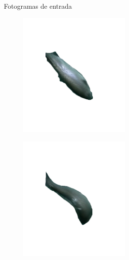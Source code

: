 \begin{enumerate}
\begin{figure}[H]
\begin{subfigure}[b]{\textwidth}
\begin{subfigure}[b]{0.25\textwidth}
                \end{subfigure}
                \caption{Fotogramas de entrada}
                \label{fig:FotogramasEntrada}
            \end{subfigure}
            \begin{subfigure}[b]{\textwidth}
                \centering
                \begin{subfigure}[b]{0.25\textwidth}
                    \centering
                    \includegraphics[width=0.8\textwidth]{images/6/Vacio2.png}
                    \label{fig:Vacio2}
                \end{subfigure}
                \begin{subfigure}[b]{0.25\textwidth}
                    \centering
                    \includegraphics[width=0.8\textwidth]{images/6/Vacio3.png}

\end{subfigure}
\end{subfigure}
\end{figure}
\end{enumerate}
